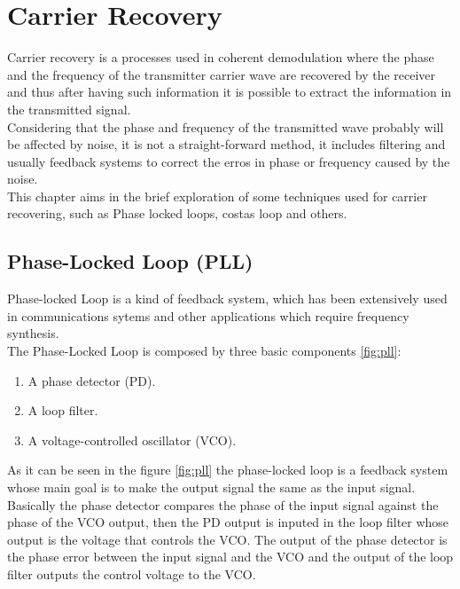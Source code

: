 \chapter{Carrier Recovery}

Carrier recovery is a processes used in coherent demodulation where the phase
and the frequency of the transmitter carrier wave are recovered by the receiver
and thus after having such information it is possible to extract the information
in the transmitted signal.\\
Considering that the phase and frequency of the transmitted wave probably will
be affected by noise, it is not a straight-forward method, it includes filtering
and usually feedback systems to correct the erros in phase or frequency caused
by the noise.\\
This chapter aims in the brief exploration of some techniques used for carrier
recovering, such as Phase locked loops, costas loop and others.\\

\section{Phase-Locked Loop (PLL)}
\label{sec:pll}

Phase-locked Loop is a kind of feedback system, which has been extensively used
in communications sytems and other applications which require frequency
synthesis.\\
The Phase-Locked Loop is composed by three basic components \ref{fig:pll}:

\begin{enumerate}
    \item A phase detector (PD).
    \item A loop filter.
    \item A voltage-controlled oscillator (VCO).
\end{enumerate}

As it can be seen in the figure \ref{fig:pll} the phase-locked loop is a feedback
system whose main goal is to make the output signal the same as the input
signal. Basically the phase detector compares the phase of the input signal
against the phase of the VCO output, then the PD output is inputed in the loop
filter whose output is the voltage that controls the VCO. The output of the
phase detector is the phase error between the input signal and the VCO and the
output of the loop filter outputs the control voltage to the VCO.\\

